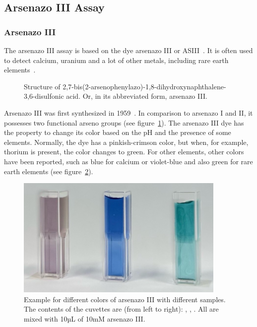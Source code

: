 \newpage


\subsection{Arsenazo III Assay}

\subsubsection{Arsenazo III}
The arsenazo III assay is based on the dye arsenazo III or ASIII~\cite{arsenazo3assay}.
It is often used to detect calcium, uranium and a lot of other metals, including rare earth elements~\cite{arsenazo3usage, arsenazo3othermetals}.

\begin{figure}[H]
    \centering
    \caption{Structure of 2,7-bis(2-arsenophenylazo)-1,8-dihydroxynaphthalene-3,6-disulfonic acid. Or, in its abbreviated form, arsenazo III.}
    \label{fig:asiii_structure}
\end{figure}

Arsenazo III was first synthesized in 1959~\cite{arsenazo3fortyyears}.
In comparison to arsenazo I and II, it possesses two functional arseno groups (see figure~\ref{fig:asiii_structure}).
The arsenazo III dye has the property to change its color based on the pH and the presence of some elements.
Normally, the dye has a pinkish-crimson color, but when, for example, thorium is present, the color changes to green.
For other elements, other colors have been reported, such as blue for calcium or violet-blue and also green for rare earth elements (see figure~\ref{fig:asiii_colors}).

\begin{figure}[H]
    \centering
    \includegraphics[width=0.9\textwidth]{./media/images/asiii_color_change}
    \caption{Example for different colors of arsenazo III with different samples. The contents of the cuvettes are (from left to right): , , . All are mixed with 10µL of 10mM arsenazo III.}
    \label{fig:asiii_colors}
\end{figure}

